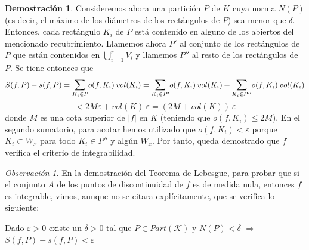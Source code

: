 \documentclass[12pt,twoside]{report}
\newcommand\mc[1]{\mathcal{#1}}
\theoremstyle{azul}
\theoremstyle{azul2}
\theoremstyle{plain}
\theoremstyle{definition}
\newtheorem*{dem}{Demostración}
\theoremstyle{remark}
\newtheorem*{obs}{Observación}
\begin{document}
\begin{dem}
Consideremos ahora una partición $P$ de $K$ cuya norma $N(P)$ (es decir, el máximo de los diámetros de los rectángulos de $P$) sea menor que $\delta$. Entonces, cada rectángulo $K_i$ de $P$ está contenido en alguno de los abiertos del mencionado recubrimiento. Llamemos ahora $P'$ al conjunto de los rectángulos de $P$ que están contenidos en $\bigcup_{i=1}^r V_i$ y llamemos $P''$ al resto de los rectángulos de $P$. Se tiene entonces que 
$$S(f,P) - s(f,P) = \underset{K_i \in P}{\mathlarger{\sum}} o(f,K_i) \: vol(K_i) = \underset{K_i \in P'}{\mathlarger{\sum}} o(f,K_i) \: vol(K_i) + \underset{K_i \in P''}{\mathlarger{\sum}} o(f,K_i) \: vol(K_i)$$ $$< 2 M \varepsilon +  vol(K) \: \varepsilon= (2M+ vol(K)) \: \varepsilon$$ 
donde $M$ es una cota superior de $|f|$ en $K$ (teniendo que $o(f,K_i) \leq 2M$). En el segundo sumatorio, para acotar hemos utilizado que $o(f,K_i) < \varepsilon$ porque $K_i \subset W_x$ para todo $K_i \in P''$ y algún $W_x$. Por tanto, queda demostrado que $f$ verifica el criterio de integrabilidad.
\end{dem}
\begin{obs}
En la demostración del Teorema de Lebesgue, para probar que si el conjunto $A$ de los puntos de discontinuidad de $f$ es de medida nula, entonces $f$ es integrable, vimos, aunque no se citara explícitamente, que se verifica lo siguiente: \vspace{-5mm}
\begin{center} \underline{Dado $\varepsilon > 0$ existe un $\delta>0$ tal que $P \in Part(\mc{K})$ y $N(P) < \delta$ $\Rightarrow$ 
$S(f, P) - s(f,P) < \varepsilon$} \end{center}
\end{obs}
\end{document}
